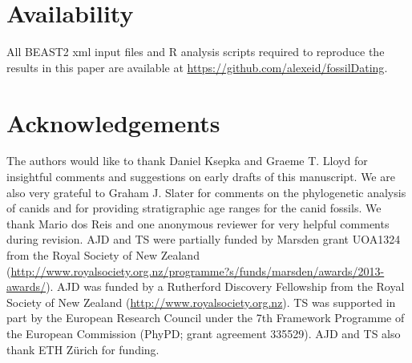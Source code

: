 \documentclass[11pt]{article}
\begin{document}
\section*{Availability}

All BEAST2 xml input files and R analysis scripts required to reproduce the results in this paper are available at \url{https://github.com/alexeid/fossilDating}.

\section*{Acknowledgements}

The authors would like to thank Daniel Ksepka and Graeme T. Lloyd for insightful comments and suggestions on early drafts of this manuscript. %
We are also very grateful to Graham J. Slater for comments on the phylogenetic analysis of canids and for providing stratigraphic age ranges for the canid fossils. We thank Mario dos Reis and one anonymous reviewer for very helpful comments during revision.
AJD and TS were partially funded by Marsden grant UOA1324 from the Royal Society of New Zealand (\url{http://www.royalsociety.org.nz/programme?s/funds/marsden/awards/2013-awards/}). AJD was funded by a Rutherford Discovery Fellowship from the Royal Society of New Zealand (\url{http://www.royalsociety.org.nz}).  TS was supported in part by the European Research Council under the 7th Framework Programme of the European Commission (PhyPD; grant agreement 335529). AJD and TS also thank ETH Z\"{u}rich for funding.




\end{document}
